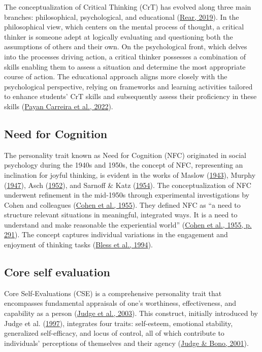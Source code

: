 \documentclass[
  12pt,
  a4paper,
  twoside]{article}
\begin{document}
The conceptualization of Critical Thinking (CrT) has evolved along three main branches: philosophical, psychological, and educational (\protect\hyperlink{ref-rear2019}{Rear, 2019}). In the philosophical view, which centers on the mental process of thought, a critical thinker is someone adept at logically evaluating and questioning both the assumptions of others and their own. On the psychological front, which delves into the processes driving action, a critical thinker possesses a combination of skills enabling them to assess a situation and determine the most appropriate course of action. The educational approach aligns more closely with the psychological perspective, relying on frameworks and learning activities tailored to enhance students' CrT skills and subsequently assess their proficiency in these skills (\protect\hyperlink{ref-payan2022}{Payan Carreira et al., 2022}).

\hypertarget{need-for-cognition}{%
\subsection{Need for Cognition}\label{need-for-cognition}}

The personality trait known as Need for Cognition (NFC) originated in social psychology during the 1940s and 1950s, the concept of NFC, representing an inclination for joyful thinking, is evident in the works of Maslow (\protect\hyperlink{ref-maslow1943}{1943}), Murphy (\protect\hyperlink{ref-murphy1947}{1947}), Asch (\protect\hyperlink{ref-asch1952}{1952}), and Sarnoff \& Katz (\protect\hyperlink{ref-sarnoff1954}{1954}). The conceptualization of NFC underwent refinement in the mid-1950s through experimental investigations by Cohen and colleagues (\protect\hyperlink{ref-cohen1955}{Cohen et al., 1955}). They defined NFC as ``a need to structure relevant situations in meaningful, integrated ways. It is a need to understand and make reasonable the experiential world'' (\protect\hyperlink{ref-cohen1955}{Cohen et al., 1955, p. 291}). The concept captures individual variations in the engagement and enjoyment of thinking tasks (\protect\hyperlink{ref-bless1994}{Bless et al., 1994}).

\hypertarget{core-self-evaluation}{%
\subsection{Core self evaluation}\label{core-self-evaluation}}

Core Self-Evaluations (CSE) is a comprehensive personality trait that encompasses fundamental appraisals of one's worthiness, effectiveness, and capability as a person (\protect\hyperlink{ref-judge2003}{Judge et al., 2003}). This construct, initially introduced by Judge et al. (\protect\hyperlink{ref-judge1997}{1997}), integrates four traits: self-esteem, emotional stability, generalized self-efficacy, and locus of control, all of which contribute to individuals' perceptions of themselves and their agency (\protect\hyperlink{ref-judge2001}{Judge \& Bono, 2001}).
\end{document}
